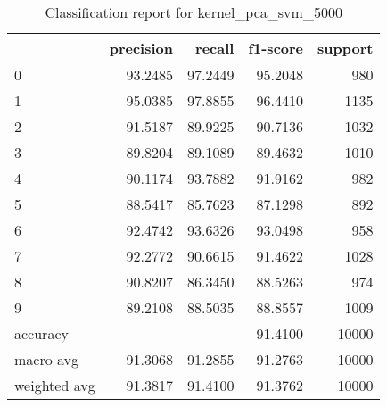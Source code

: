 \begin{table}[htb!]
\centering
\begin{tabular}{lrrrr}
    \toprule
    & precision & recall & f1-score & support \\
\midrule
0 & 93.2485 & 97.2449 & 95.2048 & 980 \\
1 & 95.0385 & 97.8855 & 96.4410 & 1135 \\
2 & 91.5187 & 89.9225 & 90.7136 & 1032 \\
3 & 89.8204 & 89.1089 & 89.4632 & 1010 \\
4 & 90.1174 & 93.7882 & 91.9162 & 982 \\
5 & 88.5417 & 85.7623 & 87.1298 & 892 \\
6 & 92.4742 & 93.6326 & 93.0498 & 958 \\
7 & 92.2772 & 90.6615 & 91.4622 & 1028 \\
8 & 90.8207 & 86.3450 & 88.5263 & 974 \\
9 & 89.2108 & 88.5035 & 88.8557 & 1009 \\
accuracy & & & 91.4100 & 10000 \\
macro avg & 91.3068 & 91.2855 & 91.2763 & 10000 \\
weighted avg & 91.3817 & 91.4100 & 91.3762 & 10000 \\
\bottomrule
\end{tabular}
\caption{Classification report for kernel_pca_svm_5000}
\label{tab:classification-report-kernel_pca_svm_5000}
\end{table}
